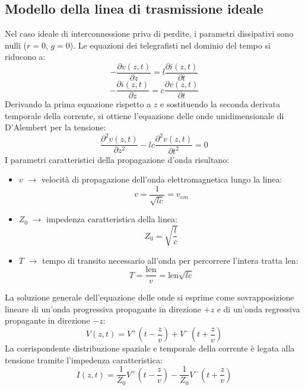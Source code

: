 \subsection{Modello della linea di trasmissione ideale}
Nel caso ideale di interconnessione priva di perdite, i parametri dissipativi sono nulli ($r = 0$, $g = 0$). Le equazioni dei telegrafisti nel dominio del tempo si riducono a:
\[
-\frac{\partial v(z,t)}{\partial z} = l \frac{\partial i(z,t)}{\partial t}
\]
\[
-\frac{\partial i(z,t)}{\partial z} = c \frac{\partial v(z,t)}{\partial t}
\]
Derivando la prima equazione rispetto a $z$ e sostituendo la seconda derivata temporale della corrente, si ottiene l'equazione delle onde unidimensionale di D'Alembert per la tensione:
\[
\frac{\partial^2 v(z,t)}{\partial z^2} - l c \frac{\partial^2 v(z,t)}{\partial t^2} = 0
\]
I parametri caratteristici della propagazione d'onda risultano:
\begin{itemize}
    \item \textbf{$v$} $\rightarrow$ velocità di propagazione dell'onda elettromagnetica lungo la linea:
    \[
    v = \frac{1}{\sqrt{l c}} = v_{em}
    \]
    \item \textbf{$Z_0$} $\rightarrow$ impedenza caratteristica della linea:
    \[
    Z_0 = \sqrt{\frac{l}{c}}
    \]
    \item \textbf{$T$} $\rightarrow$ tempo di transito necessario all'onda per percorrere l'intera tratta $\text{len}$:
    \[
    T = \frac{\text{len}}{v} = \text{len} \sqrt{l c}
    \]
\end{itemize}

La soluzione generale dell'equazione delle onde si esprime come sovrapposizione lineare di un'onda progressiva propagante in direzione $+z$ e di un'onda regressiva propagante in direzione $-z$:
\[
V(z,t) = V^+\left(t - \frac{z}{v}\right) + V^-\left(t + \frac{z}{v}\right)
\]
La corrispondente distribuzione spaziale e temporale della corrente è legata alla tensione tramite l'impedenza caratteristica:
\[
I(z,t) = \frac{1}{Z_0} V^+\left(t - \frac{z}{v}\right) - \frac{1}{Z_0} V^-\left(t + \frac{z}{v}\right)
\]

